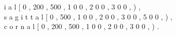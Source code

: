 \alpha i a l \colon [ 0 , 200 , 500 , 1 0 0 , 2 0 0 , 3 0 0 , \infty ) , \\ s a g i t t a l \colon [ 0 , 500 , 1 0 0 , 2 0 0 , 3 0 0 , 5 0 0 , \infty ) , \\ c o r n a l \colon [ 0 , 200 , 500 , 1 0 0 , 2 0 0 , 3 0 0 , \infty ) .
